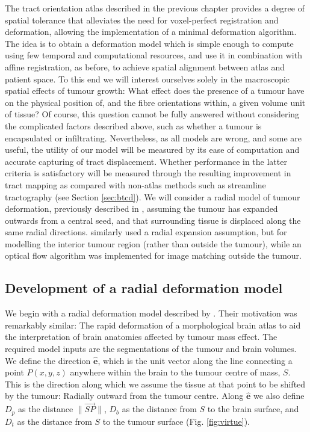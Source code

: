 The tract orientation atlas described in the previous chapter provides a degree of spatial tolerance that alleviates the need for voxel-perfect registration and deformation, allowing the implementation of a minimal deformation algorithm.
The idea is to obtain a deformation model which is simple enough to compute using few temporal and computational resources, and use it in combination with affine registration, as before, to achieve spatial alignment between atlas and patient space.
To this end we will interest ourselves solely in the macroscopic spatial effects of tumour growth:
What effect does the presence of a tumour have on the physical position of, and the fibre orientations within, a given volume unit of tissue?
Of course, this question cannot be fully answered without considering the complicated factors described above, such as whether a tumour is encapsulated or infiltrating.
Nevertheless, as all models are wrong, and some are useful, the utility of our model will be measured by its ease of computation and accurate capturing of tract displacement.
Whether performance in the latter criteria is satisfactory will be measured through the resulting improvement in tract mapping as compared with non-atlas methods such as streamline tractography (see Section \ref{sec:btcd}).
We will consider a radial model of tumour deformation, previously described in \textcite{Young2022}, assuming the tumour has expanded outwards from a central seed, and that surrounding tissue is displaced along the same radial directions.
\textcite{Cuadra2004} similarly used a radial expansion assumption, but for modelling the interior tumour region (rather than outside the tumour), while an optical flow algorithm was implemented for image matching outside the tumour.

\subsection{Development of a radial deformation model}

We begin with a radial deformation model described by \textcite{Nowinski2005}.
Their motivation was remarkably similar:
The rapid deformation of a morphological brain atlas to aid the interpretation of brain anatomies affected by tumour mass effect.
The required model inputs are the segmentations of the tumour and brain volumes.
We define the direction $\mathbf{\hat{e}}$, which is the unit vector along the line connecting a point $P(x,y,z)$ anywhere within the brain to the tumour centre of mass, $S$.
This is the direction along which we assume the tissue at that point to be shifted by the tumour:
Radially outward from the tumour centre.
Along $\mathbf{\hat{e}}$ we also define $D_p$ as the distance  $\|\overrightarrow{SP}\|$, $D_b$ as the distance from $S$ to the brain surface, and $D_t$ as the distance from $S$ to the tumour surface (Fig. \ref{fig:virtue}).

